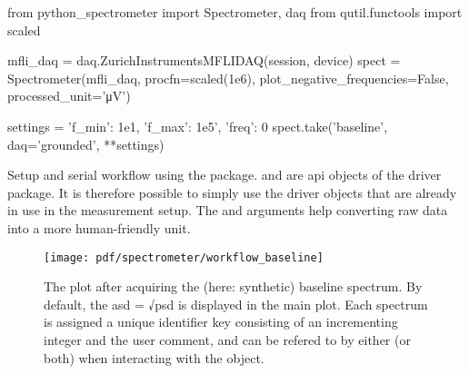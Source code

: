 \begin{listing}[htpb]
    \begin{py}
        from python_spectrometer import Spectrometer, daq
        from qutil.functools import scaled

        mfli_daq = daq.ZurichInstrumentsMFLIDAQ(session, device)
        spect = Spectrometer(mfli_daq, procfn=scaled(1e6),
                             plot_negative_frequencies=False,
                             processed_unit='μV')

        settings = {'f_min': 1e1, 'f_max': 1e5', 'freq': 0}
        spect.take('baseline', daq='grounded', **settings)
    \end{py}
    \caption[\pyspeck serial workflow]{
        Setup and serial workflow using the \pyspeck package.
         and  are \gls{api} objects of the  driver package.
        It is therefore possible to simply use the driver objects that are already in use in the measurement setup.
        The  and  arguments help converting raw data into a more human-friendly unit.
    }
    \label{lst:speck:workflow:serial}
\end{listing}
\begin{figure}
    \centering
    \texttt{[image: pdf/spectrometer/workflow\_baseline]}
    \caption{
        The \pyspeck plot after acquiring the (here: synthetic) baseline spectrum.
        By default, the \gls{asd} = √\gls{psd} is displayed in the main plot.
        Each spectrum is assigned a unique identifier key consisting of an incrementing integer and the user comment, and can be refered to by either (or both) when interacting with the object.
    }
    \label{fig:speck:software:workflow:baseline}
\end{figure}

